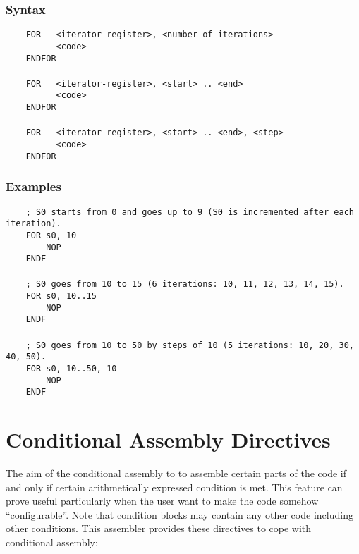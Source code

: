         \subsubsection{Syntax}
            \verb'    FOR   <iterator-register>, <number-of-iterations>'\\
            \verb'          <code>'\\
            \verb'    ENDFOR'\\
            \verb''\\
            \verb'    FOR   <iterator-register>, <start> .. <end>'\\
            \verb'          <code>'\\
            \verb'    ENDFOR'\\
            \verb''\\
            \verb'    FOR   <iterator-register>, <start> .. <end>, <step>'\\
            \verb'          <code>'\\
            \verb'    ENDFOR'

        \subsubsection{Examples}
            \verb'    ; S0 starts from 0 and goes up to 9 (S0 is incremented after each iteration).'\\
            \verb'    FOR s0, 10'\\
            \verb'        NOP'\\
            \verb'    ENDF'\\
            \verb''\\
            \verb'    ; S0 goes from 10 to 15 (6 iterations: 10, 11, 12, 13, 14, 15).'\\
            \verb'    FOR s0, 10..15'\\
            \verb'        NOP'\\
            \verb'    ENDF'\\
            \verb''\\
            \verb'    ; S0 goes from 10 to 50 by steps of 10 (5 iterations: 10, 20, 30, 40, 50).'\\
            \verb'    FOR s0, 10..50, 10'\\
            \verb'        NOP'\\
            \verb'    ENDF'

\clearpage
\section{Conditional Assembly Directives}
    The aim of the conditional assembly to to assemble certain parts of the code if and only if certain arithmetically expressed condition is met. This feature can prove useful particularly when the user want to make the code somehow ``configurable''. Note that condition blocks may contain any other code including other conditions. This assembler provides these directives to cope with conditional assembly:

